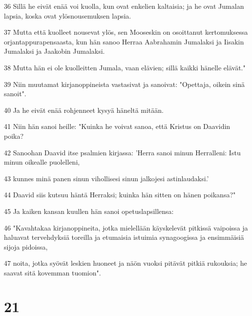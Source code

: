 \par 36 Sillä he eivät enää voi kuolla, kun ovat enkelien kaltaisia; ja he ovat Jumalan lapsia, koska ovat ylösnousemuksen lapsia.
\par 37 Mutta että kuolleet nousevat ylös, sen Mooseskin on osoittanut kertomuksessa orjantappurapensaasta, kun hän sanoo Herraa Aabrahamin Jumalaksi ja Iisakin Jumalaksi ja Jaakobin Jumalaksi.
\par 38 Mutta hän ei ole kuolleitten Jumala, vaan elävien; sillä kaikki hänelle elävät."
\par 39 Niin muutamat kirjanoppineista vastasivat ja sanoivat: "Opettaja, oikein sinä sanoit".
\par 40 Ja he eivät enää rohjenneet kysyä häneltä mitään.
\par 41 Niin hän sanoi heille: "Kuinka he voivat sanoa, että Kristus on Daavidin poika?
\par 42 Sanoohan Daavid itse psalmien kirjassa: 'Herra sanoi minun Herralleni: Istu minun oikealle puolelleni,
\par 43 kunnes minä panen sinun vihollisesi sinun jalkojesi astinlaudaksi.'
\par 44 Daavid siis kutsuu häntä Herraksi; kuinka hän sitten on hänen poikansa?"
\par 45 Ja kaiken kansan kuullen hän sanoi opetuslapsillensa:
\par 46 "Kavahtakaa kirjanoppineita, jotka mielellään käyskelevät pitkissä vaipoissa ja haluavat tervehdyksiä toreilla ja etumaisia istuimia synagoogissa ja ensimmäisiä sijoja pidoissa,
\par 47 noita, jotka syövät leskien huoneet ja näön vuoksi pitävät pitkiä rukouksia; he saavat sitä kovemman tuomion".

\chapter{21}


